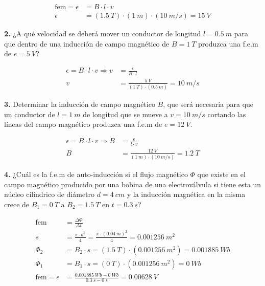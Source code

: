 \documentclass[../main]{subfiles}
\begin{document}
\begin{align*}
\text{fem} = \epsilon &= B \cdot l \cdot v \\
\epsilon &= (\qty{1,5}{T}) \cdot (\qty{1}{m}) \cdot (\qty{10}{m/s}) = \boxed{\qty{15}{V}}
\end{align*}

\noindent\textbf{2.} ¿A qué velocidad se deberá mover un conductor de longitud $l = \qty{0,5}{m}$ para que dentro de una inducción de campo magnético de $B = \qty{1}{T}$ produzca una f.e.m de $e = \qty{5}{V}$?

\begin{align*}
\epsilon = B \cdot l \cdot v \Rightarrow v &= \frac{\epsilon}{B \cdot l} \\
v &= \frac{\qty{5}{V}}{(\qty{1}{T}) \cdot (\qty{0,5}{m})} = \boxed{\qty{10}{m/s}}
\end{align*}

\noindent\textbf{3.} Determinar la inducción de campo magnético $B$, que será necesaria para que un conductor de $l = \qty{1}{m}$ de longitud que se mueve a $v = \qty{10}{m/s}$ cortando las líneas del campo magnético produzca una f.e.m de $e = \qty{12}{V}$.

\begin{align*}
\epsilon = B \cdot l \cdot v \Rightarrow B &= \frac{\epsilon}{l \cdot v} \\
B &= \frac{\qty{12}{V}}{(\qty{1}{m}) \cdot (\qty{10}{m/s})} = \boxed{\qty{1,2}{T}}
\end{align*}

\noindent\textbf{4.} ¿Cuál es la f.e.m de auto-inducción si el flujo magnético $\Phi$ que existe en el campo magnético producido por una bobina de una electroválvula si tiene esta un núcleo cilíndrico de diámetro $d = \qty{4}{cm}$ y la inducción magnética en la misma crece de $B_1 = \qty{0}{T}$ a $B_2 = \qty{1,5}{T}$ en $t = \qty{0,3}{s}$?

\begin{align*}
\text{fem} &= \frac{\Delta \Phi}{\Delta t} \\
s &= \frac{\pi \cdot d^2}{4} = \frac{\pi \cdot (\qty{0,04}{m})^2}{4} = \qty{0,001256}{m^2} \\
\Phi_2 &= B_2 \cdot s = (\qty{1,5}{T}) \cdot (\qty{0,001256}{m^2}) = \qty{0,001885}{Wb} \\
\Phi_1 &= B_1 \cdot s = (\qty{0}{T}) \cdot (\qty{0,001256}{m^2}) = \qty{0}{Wb} \\
\text{fem} = \epsilon &= \frac{\qty{0,001885}{Wb} - \qty{0}{Wb}}{\qty{0,3}{s} - \qty{0}{s}} = \boxed{\qty{0,00628}{V}}
\end{align*}
\end{document}
